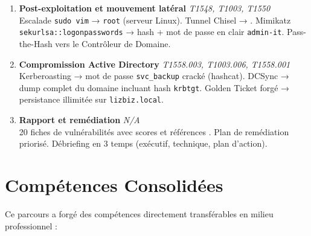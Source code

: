 \begin{boxresume}
\begin{enumerate}
    \item \textbf{Post-exploitation et mouvement latéral} \hfill \textit{T1548, T1003, T1550}\\
          Escalade \texttt{sudo vim} → \texttt{root} (serveur Linux).
          Tunnel Chisel  → . Mimikatz
          \texttt{sekurlsa::logonpasswords} → hash + mot de passe en clair
          \texttt{admin-it}. Pass-the-Hash vers le Contrôleur de Domaine.

    \item \textbf{Compromission Active Directory} \hfill \textit{T1558.003, T1003.006, T1558.001}\\
          Kerberoasting → mot de passe \texttt{svc\_backup} cracké (hashcat).
          DCSync → dump complet du domaine incluant hash \texttt{krbtgt}.
          Golden Ticket forgé → persistance illimitée sur \texttt{lizbiz.local}.

    \item \textbf{Rapport et remédiation} \hfill \textit{N/A}\\
          20 fiches de vulnérabilités avec scores  et
          références . Plan de remédiation priorisé.
          Débriefing en 3 temps (exécutif, technique, plan d'action).
\end{enumerate}
\end{boxresume}

\section*{Compétences Consolidées}

Ce parcours a forgé des compétences directement transférables en milieu
professionnel :

